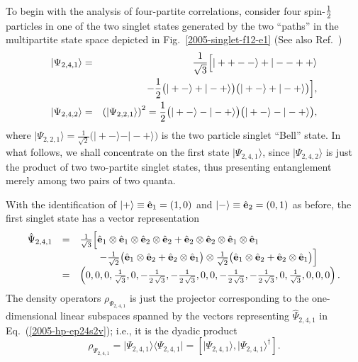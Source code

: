 \documentclass[fleqn,twoside]{article}      %
\begin{document}
To begin with the analysis of four-partite correlations,  consider four spin-${1\over 2}$
particles in one of the two singlet states generated by the two ``paths''
in the multipartite state space depicted in Fig.~\ref{2005-singlet-f12-e1}
(See also Ref.~\cite{schimpf-svozil})
\begin{eqnarray}
\vert \Psi_{2,4,1} \rangle
&=&
{1\over \sqrt{3}}\Bigl[
\vert ++-- \rangle +
\vert --++ \rangle \nonumber \\
&&\qquad
\qquad
-  {1\over 2}
\bigl(
\vert +- \rangle +
\vert -+ \rangle
\bigr)
\bigl(
\vert +- \rangle +
\vert -+ \rangle
\bigr)
\Bigr],
\label{2005-hp-ep24s2}
\\
\vert \Psi_{2,4,2} \rangle
&=&
\left( \vert \Psi_{2,2,1} \rangle \right)^2
=
{1\over 2}
\bigl(
\vert +- \rangle -
\vert -+ \rangle
\bigr)
\bigl(
\vert +- \rangle -
\vert -+ \rangle
\bigr),
\label{2004-gtq-s1}
\end{eqnarray}
where
$\vert \Psi_{2,2,1} \rangle = \frac{1}{\sqrt{ 2}}
\bigl(
\vert +- \rangle -
\vert -+ \rangle
\bigr)
$
is the two particle singlet ``Bell'' state.
In what follows, we shall concentrate on the first state
$\vert \Psi_{2,4,1} \rangle$, since  $\vert \Psi_{2,4,2} \rangle$
is just the product of two two-partite singlet states,
thus presenting entanglement merely among two pairs of two quanta.

With the identification of
$
\vert +\rangle
\equiv {\hat {\bf e}}_1 =(1,0)
$
and
$
\vert -\rangle \equiv {\hat {\bf e}}_2 =(0,1)
$ as before,
the first singlet state has a vector representation
\begin{equation}
\begin{array}{rcl}
\hat  \Psi_{2,4,1}
&=&
{1\over \sqrt{3}}\Bigl[
{\hat {\bf e}}_1\otimes {\hat {\bf e}}_1\otimes {\hat {\bf e}}_2\otimes {\hat {\bf e}}_2+
{\hat {\bf e}}_2\otimes {\hat {\bf e}}_2\otimes {\hat {\bf e}}_1\otimes {\hat {\bf e}}_1
 \nonumber \\
&&\qquad
-  {1\over \sqrt{2}}\bigl({\hat {\bf e}}_1\otimes {\hat {\bf e}}_2+{\hat {\bf e}}_2\otimes {\hat {\bf e}}_1 \bigr)
\otimes
 {1\over \sqrt{2}}\bigl({\hat {\bf e}}_1\otimes {\hat {\bf e}}_2+{\hat {\bf e}}_2\otimes {\hat {\bf e}}_1 \bigr)
\Bigr]\nonumber \\
&=&\left( 0,0,0,\frac{1}{{\sqrt{3}}},0,
  -\frac{1}{2\,{\sqrt{3}}},-\frac{1}{2\,{\sqrt{3}}},0,
  0,-\frac{1}{2\,{\sqrt{3}}},-\frac{1}{2\,{\sqrt{3}}},
  0,\frac{1}{{\sqrt{3}}},0,0,0\right).
\label{2005-hp-ep24s2v}
\end{array}
\end{equation}
The density operators $\rho_{\Psi_{2,4,1}}$
is just the projector corresponding to the one-dimensional
linear subspaces spanned by
the vectors representing
$ \hat \Psi_{2,4,1}$
in Eq.~(\ref{2005-hp-ep24s2v}); i.e.,
it is the dyadic product
\begin{equation}
\rho_{\Psi_{2,4,1}} = \vert { \Psi}_{2,4,1}\rangle \langle { \Psi}_{2,4,1}\vert =
\left[\vert { \Psi}_{2,4,1}\rangle,\vert { \Psi}_{2,4,1}\rangle^\dagger \right].
\end{equation}
\end{document}
